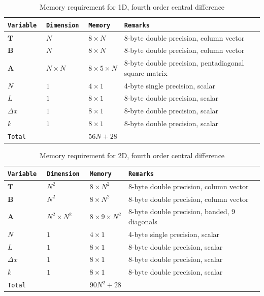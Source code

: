 \documentclass[12pt]{amsart}   %
\begin{document}
\begin{table}[htbp!] \caption{Memory requirement for 1D, fourth order central difference}
\begin{tabular}{lllll}
\tt{Variable} & \tt{Dimension} & \tt{Memory} & \tt{Remarks}  \\
\hline
 $\textbf{T}$ & $N$ & $8\times N$ & 8-byte double precision, column vector \\
 $\textbf{B}$ & $N$ & $8\times N$ & 8-byte double precision, column vector \\
 $\textbf{A}$ & $N \times N$ & $8 \times 5 \times N$ & 8-byte double precision, pentadiagonal square matrix \\
 $N$ & $1$ & $4 \times1$ & 4-byte single precision, scalar \\
 $L$ & $1$ & $8 \times1$ & 8-byte double precision, scalar\\
 $\Delta x$ & $1$ & $8 \times 1$ & 8-byte double precision, scalar\\
 $k$ & $1$ & $8 \times 1$ & 8-byte double precision, scalar\\
 \hline
 \tt{Total} & & $56N + 28 $ & \\
\end{tabular}
\end{table}

\begin{table}[htbp!] \caption{Memory requirement for 2D, fourth order central difference}
\begin{tabular}{lllll}
\tt{Variable} & \tt{Dimension} & \tt{Memory} & \tt{Remarks}  \\
\hline
 $\textbf{T}$ & $N^2$ & $8\times N^2$ & 8-byte double precision, column vector \\
 $\textbf{B}$ & $N^2$ & $8\times N^2$ & 8-byte double precision, column vector \\
 $\textbf{A}$ & $N^2 \times N^2$ & $8 \times 9 \times N^2$ & 8-byte double precision, banded, 9 diagonals \\
 $N$ & $1$ & $4 \times1$ & 4-byte single precision, scalar \\
 $L$ & $1$ & $8 \times1$ & 8-byte double precision, scalar\\
 $\Delta x$ & $1$ & $8 \times 1$ & 8-byte double precision, scalar\\
 $k$ & $1$ & $8 \times 1$ & 8-byte double precision, scalar\\
 \hline
 \tt{Total} & & $90N^2 + 28 $ & \\
\end{tabular}
\end{table}
\newpage



\end{document}
